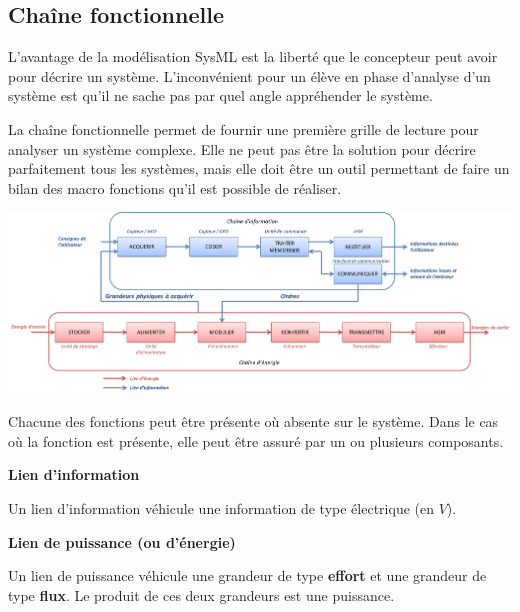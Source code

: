 \documentclass[11pt,oneside]{article}
\begin{document}
\subsection{Chaîne fonctionnelle}
L'avantage de la modélisation SysML est la liberté que le concepteur peut avoir pour décrire un système. L'inconvénient pour un élève en phase d'analyse d'un système est qu'il ne sache pas par quel angle appréhender le système. 


La chaîne fonctionnelle permet de fournir une première grille de lecture pour analyser un système complexe. Elle ne peut pas être la solution pour décrire parfaitement tous les systèmes, mais elle doit être un outil permettant de faire un bilan des macro fonctions qu'il est possible de réaliser. 

\begin{center}
\includegraphics[width=\textwidth]{png/chaine_fonc}
\end{center}

Chacune des fonctions peut être présente où absente sur le système. Dans le cas où la fonction est présente, elle peut être assuré par un ou plusieurs composants. 

\begin{defi}
\textbf{Lien d'information}

Un lien d'information véhicule une information de type électrique (en $V$).

\textbf{Lien de puissance (ou d'énergie)}

Un lien de puissance véhicule une grandeur de type \textbf{effort} et une grandeur de type \textbf{flux}. Le produit de ces deux grandeurs est une puissance.

\end{defi}
\end{document}
